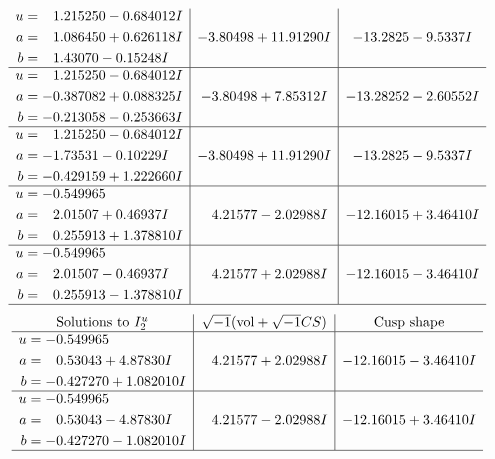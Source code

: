 \documentclass[1p]{elsarticle_modified}
\theoremstyle{definition}
\newcommand{\I}{\sqrt{-1}}
\begin{document}
$$\begin{array}{c|c|c}
\begin{aligned}
u &= \phantom{-}1.215250 - 0.684012 I \\
a &= \phantom{-}1.086450 + 0.626118 I \\
b &= \phantom{-}1.43070 - 0.15248 I\end{aligned}
 & -3.80498 + 11.91290 I & -13.2825 - 9.5337 I \\ \hline\begin{aligned}
u &= \phantom{-}1.215250 - 0.684012 I \\
a &= -0.387082 + 0.088325 I \\
b &= -0.213058 - 0.253663 I\end{aligned}
 & -3.80498 + 7.85312 I & -13.28252 - 2.60552 I \\ \hline\begin{aligned}
u &= \phantom{-}1.215250 - 0.684012 I \\
a &= -1.73531 - 0.10229 I \\
b &= -0.429159 + 1.222660 I\end{aligned}
 & -3.80498 + 11.91290 I & -13.2825 - 9.5337 I \\ \hline\begin{aligned}
u &= -0.549965\phantom{ +0.000000I} \\
a &= \phantom{-}2.01507 + 0.46937 I \\
b &= \phantom{-}0.255913 + 1.378810 I\end{aligned}
 & \phantom{-}4.21577 - 2.02988 I & -12.16015 + 3.46410 I \\ \hline\begin{aligned}
u &= -0.549965\phantom{ +0.000000I} \\
a &= \phantom{-}2.01507 - 0.46937 I \\
b &= \phantom{-}0.255913 - 1.378810 I\end{aligned}
 & \phantom{-}4.21577 + 2.02988 I & -12.16015 - 3.46410 I\\
 \hline 
 \end{array}$$\newpage$$\begin{array}{c|c|c}  
\text{Solutions to }I^u_{2}& \I (\text{vol} + \sqrt{-1}CS) & \text{Cusp shape}\\
 \hline 
\begin{aligned}
u &= -0.549965\phantom{ +0.000000I} \\
a &= \phantom{-}0.53043 + 4.87830 I \\
b &= -0.427270 + 1.082010 I\end{aligned}
 & \phantom{-}4.21577 + 2.02988 I & -12.16015 - 3.46410 I \\ \hline\begin{aligned}
u &= -0.549965\phantom{ +0.000000I} \\
a &= \phantom{-}0.53043 - 4.87830 I \\
b &= -0.427270 - 1.082010 I\end{aligned}
 & \phantom{-}4.21577 - 2.02988 I & -12.16015 + 3.46410 I\\
 \hline 
 \end{array}$$\newpage\newpage\renewcommand{\arraystretch}{1}
\end{document}

